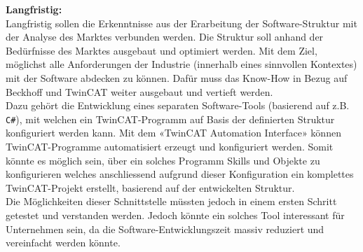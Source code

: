 	\vspace{3mm}  
	
	\textbf{Langfristig:}
	\vspace{2mm}  
	\\
	Langfristig sollen die Erkenntnisse aus der Erarbeitung der Software-Struktur mit der Analyse des Marktes verbunden werden. Die Struktur soll anhand der Bedürfnisse des Marktes ausgebaut und optimiert werden. Mit dem Ziel, möglichst alle Anforderungen der Industrie (innerhalb eines sinnvollen Kontextes) mit der Software abdecken zu können. Dafür muss das Know-How in Bezug auf Beckhoff und TwinCAT weiter ausgebaut und vertieft werden. 
	\\
	Dazu gehört die Entwicklung eines separaten Software-Tools (basierend auf z.B. \verb|C#|), mit welchen ein TwinCAT-Programm auf Basis der definierten Struktur konfiguriert werden kann. Mit dem «TwinCAT Automation Interface» können TwinCAT-Programme automatisiert erzeugt und konfiguriert werden. Somit könnte es möglich sein, über ein solches Programm Skills und Objekte zu konfigurieren welches anschliessend aufgrund dieser Konfiguration ein komplettes TwinCAT-Projekt erstellt, basierend auf der entwickelten Struktur.
	\\
	Die Möglichkeiten dieser Schnittstelle müssten jedoch in einem ersten Schritt getestet und verstanden werden. Jedoch könnte ein solches Tool interessant für Unternehmen sein, da die Software-Entwicklungszeit massiv reduziert und vereinfacht werden könnte.